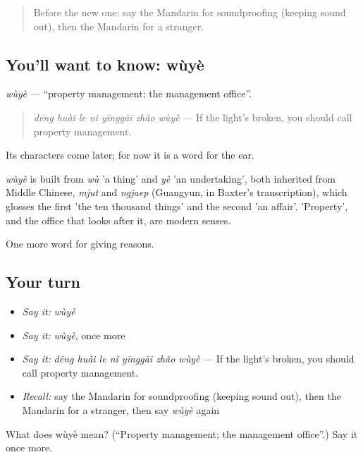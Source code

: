 \label{lesson:ZH-C378-wuye}



\begin{quote}
Before the new one: say the Mandarin for soundproofing (keeping sound out), then the Mandarin for a stranger.
\end{quote}

\subsection*{You'll want to know: wùyè}
\emph{wùyè} — \textquotedblleft{}property management; the management office\textquotedblright{}.

\begin{quote}
\emph{dēng huài le nǐ yīnggāi zhǎo wùyè} — If the light's broken, you should call property management.
\end{quote}

Its characters come later; for now it is a word for the ear.

\begin{cousinweb}
\emph{wùyè} is built from \emph{wù} 'a thing' and \emph{yè} 'an undertaking', both inherited from Middle Chinese, \emph{mjut} and \emph{ngjaep} (Guangyun, in Baxter's transcription), which glosses the first 'the ten thousand things' and the second 'an affair'. 'Property', and the office that looks after it, are modern senses.
\end{cousinweb}

\begin{grammarlens}[title={What you've built}]
One more word for giving reasons.
\end{grammarlens}

\subsection*{Your turn}
\begin{itemize}
\raggedright
  \item \emph{Say it:} \emph{wùyè}
  \item \emph{Say it:} \emph{wùyè}, once more
  \item \emph{Say it:} \emph{dēng huài le nǐ yīnggāi zhǎo wùyè} — If the light's broken, you should call property management.
  \item \emph{Recall:} say the Mandarin for soundproofing (keeping sound out), then the Mandarin for a stranger, then say \emph{wùyè} again
\end{itemize}

\begin{tcolorbox}[breakable,colback=teal!4,colframe=teal!35!black,title={Before you move on}]
What does wùyè mean? (\textquotedblleft{}Property management; the management office\textquotedblright{}.) Say it once more.
\end{tcolorbox}
